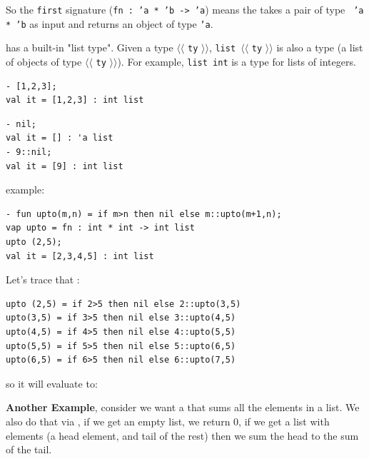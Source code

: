So the \texttt{first}  signature (\texttt{fn : ’a * ’b -> ’a}) means the  takes a pair of type \texttt{ ’a * ’b} as input and returns an object of type  \texttt{’a}.

 has a built-in "list type". Given a type $\langle \langle$ \texttt{ty} $\rangle \rangle$, \texttt{list }$\langle \langle$ \texttt{ty} $\rangle \rangle$ is also a type (a list of objects of type $\langle \langle$ \texttt{ty} $\rangle \rangle$). For example, \texttt{list int} is a type for lists of integers. 
\begin{verbatim}
- [1,2,3];
val it = [1,2,3] : int list
\end{verbatim}

\begin{verbatim}
- nil;
val it = [] : 'a list
- 9::nil;
val it = [9] : int list
\end{verbatim}


 example:
\begin{verbatim}
- fun upto(m,n) = if m>n then nil else m::upto(m+1,n);
vap upto = fn : int * int -> int list
upto (2,5);
val it = [2,3,4,5] : int list
\end{verbatim}

Let's trace that : 
\begin{verbatim}
upto (2,5) = if 2>5 then nil else 2::upto(3,5)
upto(3,5) = if 3>5 then nil else 3::upto(4,5)
upto(4,5) = if 4>5 then nil else 4::upto(5,5)
upto(5,5) = if 5>5 then nil else 5::upto(6,5)
upto(6,5) = if 6>5 then nil else 6::upto(7,5)
\end{verbatim}

so it will evaluate to: 

\textbf{Another Example}, consider we want a  that sums all the elements in a list. We also do that via , if we get an empty list, we return 0, if we get a list with elements (a head element, and tail of the rest) then we sum the head to the sum of the tail.

